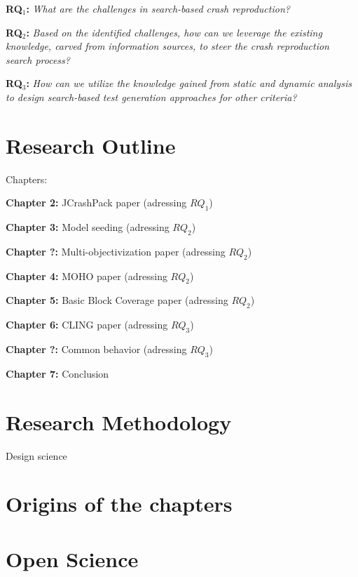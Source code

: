 \textbf{RQ$_1$: } \textit{What are the challenges in search-based crash reproduction?}

\textbf{RQ$_2$: } \textit{Based on the identified challenges, how can we leverage the existing knowledge, carved from information sources, to steer the crash reproduction search process?}

\textbf{RQ$_3$: } \textit{How can we utilize the knowledge gained from static and dynamic analysis to design search-based test generation approaches for other criteria?}


\section{Research Outline}

Chapters:

\textbf{Chapter 2: } JCrashPack paper (adressing $RQ_1$)


\textbf{Chapter 3: } Model seeding (adressing $RQ_2$)

\textbf{Chapter ?: } Multi-objectivization paper (adressing $RQ_2$)

\textbf{Chapter 4: } MOHO paper (adressing $RQ_2$)

\textbf{Chapter 5: } Basic Block Coverage paper (adressing $RQ_2$)

\textbf{Chapter 6: } CLING paper (adressing $RQ_3$)

\textbf{Chapter ?: } Common behavior (adressing $RQ_3$)

\textbf{Chapter 7: } Conclusion


\section{Research Methodology}

Design science \cite{Hevner2004}

\section{Origins of the chapters}

\section{Open Science}



